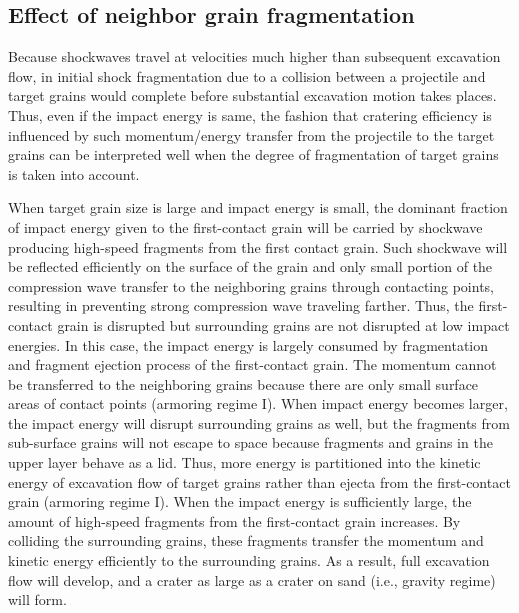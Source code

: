 \documentclass[3p,authoryear]{elsarticle}
\newcommand{\II}{I\hspace{-.1 em}I}
\begin{document}
\subsection{Effect of neighbor grain fragmentation}\label{sec:mechanism}
Because shockwaves travel at velocities much higher than subsequent excavation flow, in initial shock fragmentation due to a collision between a projectile and target grains would complete before substantial excavation motion takes places.
Thus, even if the impact energy is same, the fashion that cratering efficiency is influenced by such momentum/energy transfer from the projectile to the target grains can be interpreted well when the degree of fragmentation of target grains is taken into account.

When target grain size is large and impact energy is small, the dominant fraction of impact energy given to the first-contact grain will be carried by shockwave producing high-speed fragments from the first contact grain.
Such shockwave will be reflected efficiently on the surface of the grain and only small portion of the compression wave transfer to the neighboring grains through contacting points, resulting in preventing strong compression wave traveling farther.
Thus, the first-contact grain is disrupted but surrounding grains are not disrupted at low impact energies. In this case, the impact energy is largely consumed by fragmentation and fragment ejection process of the first-contact grain.
The momentum cannot be transferred to the neighboring grains because there are only small surface areas of contact points (armoring regime I).
When impact energy becomes larger, the impact energy will disrupt surrounding grains as well, but the fragments from sub-surface grains will not escape to space because fragments and grains in the upper layer behave as a lid.
Thus, more energy is partitioned into the kinetic energy of excavation flow of target grains rather than ejecta from the first-contact grain (armoring regime I).
When the impact energy is sufficiently large, the amount of high-speed fragments from the first-contact grain increases.
By colliding the surrounding grains, these fragments transfer the momentum and kinetic energy efficiently to the surrounding grains.
As a result, full excavation flow will develop, and a crater as large as a crater on sand (i.e., gravity regime) will form.
\end{document}

